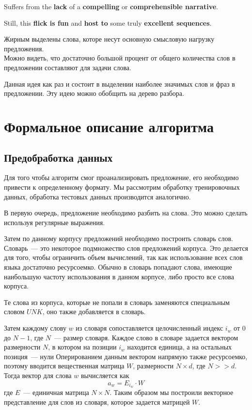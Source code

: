 {\selectfont Suffers from the \textbf{lack} of a \textbf{compelling} or \textbf{comprehensible narrative}.}

{\selectfont Still, this \textbf{flick is fun} and \textbf{host to} some truly \textbf{excellent sequences}.}

\noindent Жирным выделены слова, которе несут основную смысловую нагрузку предложения.\\
Можно видеть, что достаточно большой процент от общего количества слов в предложении составляют 
 для задачи слова.

Данная идея как раз и состоит в выделении наиболее значимых слов и фраз в предложении.
Эту идею можно обобщить на дерево разбора.

\section{Формальное описание алгоритма}

\subsection{Предобработка данных}
Для того чтобы алгоритм смог проанализировать предложение, 
его необходимо привести к определенному формату. Мы рассмотрим обработку
тренировочных данных, обработка тестовых данных производится аналогично.

В первую очередь, предложение необходимо разбить на слова. 
Это можно сделать используя регулярные выражения. 

Затем по данному корпусу предложений необходимо построить словарь слов.
Словарь~--- это некоторое подмножество слов предложений корпуса.
Это делается для того, чтобы ограничить объем вычислений, так как использование всех
слов языка достаточно ресурсоемко. Обычно в словарь попадают слова, 
имеющие наибольшую частоту использования в данном корпусе, 
либо просто все слова корпуса.

Те слова из корпуса, которые не попали в словарь заменяются специальным словом $UNK$, 
оно также добавляется в словарь.

Затем каждому слову $w$ из словаря сопоставляется целочисленный индекс $i_w$ 
от $0$ до $N-1$, где $N$~--- размер словаря.
Каждое слово в словаре задается вектором размерности $N$, 
в котором на позиции $i_w$ находится единица, а на остальных позиция~--- нули
Оперированием данным вектором напрямую также ресурсоемко, поэтому вводится вещественная матрица $W$, 
размерности $N \times d$, где $N >> d$. Тогда вектор для слова $w$ вычисляется как
$$a_w = E_{i_w} \cdot W$$
где $E$~--- единичная матрица $N \times N$.
Таким образом мы построили векторное представление для слов из словаря, которое задается матрицей $W$.

